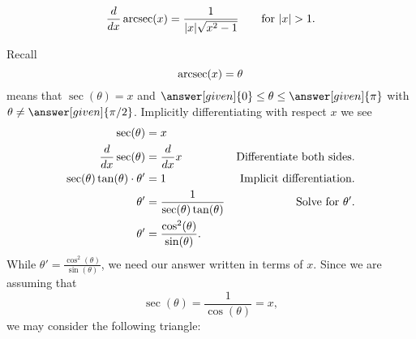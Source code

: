 \documentclass{ximera}
\begin{document}
\begin{theorem}
\[
\ddx \arcsec(x) = \frac{1}{|x|\sqrt{x^2-1}}\qquad\text{for $|x|>1$.}
\]
\begin{explanation} 
  Recall
\[
\operatorname{arcsec}(x) = \theta
\]
means that $\sec(\theta) = x$ and $\answer[given]{0}\le \theta\le
\answer[given]{\pi}$ with $\theta\ne \answer[given]{\pi/2}$.  Implicitly
differentiating with respect $x$ we see
\begin{align*}
\sec(\theta) &= x\\
\frac{d}{\mathop{}\!d x} \sec(\theta) &= \frac{d}{\mathop{}\!d x} x                     &\text{Differentiate both sides.}\\
\sec(\theta)\tan(\theta) \cdot \theta' &= 1     &\text{Implicit differentiation.}\\
\theta' &= \frac{1}{\sec(\theta)\tan(\theta)}   &\text{Solve for $\theta'$.}\\
\theta' &= \frac{\cos^2(\theta)}{\sin(\theta)}.
\end{align*}
While $\theta' = \frac{\cos^2(\theta)}{\sin(\theta)}$, we need our
answer written in terms of $x$. Since we are assuming that
\[
\sec(\theta) = \frac{1}{\cos(\theta)}= x,
\]
we may consider the following triangle:
    \begin{image}[2in]
\end{image}
\end{explanation}
\end{theorem}
\end{document}
